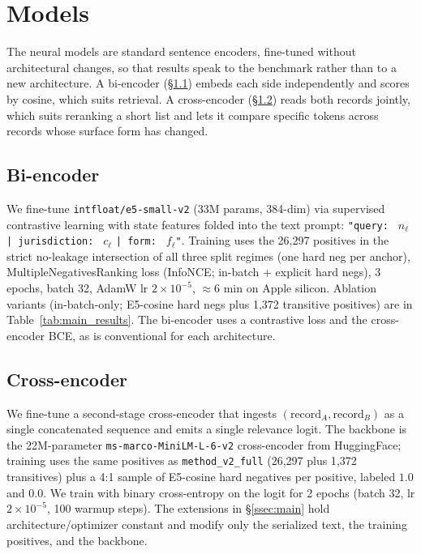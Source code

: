 \documentclass[sigconf]{acmart}
\begin{document}
\section{Models}
\label{sec:method}

The neural models are standard sentence encoders, fine-tuned
without architectural changes, so that results speak to the
benchmark rather than to a new architecture. A bi-encoder (\S\ref{ssec:bi}) embeds each side
independently and scores by cosine, which suits retrieval. A
cross-encoder (\S\ref{ssec:ce}) reads both records jointly, which
suits reranking a short list and lets it compare specific tokens
across records whose surface form has changed.

\subsection{Bi-encoder}
\label{ssec:bi}

We fine-tune \texttt{intfloat/e5-small-v2} (33M params, 384-dim) via
supervised contrastive learning with state features folded into the
text prompt: \texttt{"query: } $n_\ell$ \texttt{| jurisdiction: }
$c_\ell$ \texttt{| form: } $f_\ell$\texttt{"}. Training uses the
26{,}297 positives in the strict no-leakage intersection of all
three split regimes (one hard neg per anchor), MultipleNegativesRanking
loss (InfoNCE; in-batch + explicit hard negs), 3 epochs, batch 32,
AdamW lr $2\times10^{-5}$, $\approx$6 min on Apple silicon.
Ablation variants (in-batch-only; E5-cosine hard negs plus 1{,}372
transitive positives) are in Table~\ref{tab:main_results}. The
bi-encoder uses a contrastive loss and the cross-encoder BCE, as is
conventional for each architecture.

\subsection{Cross-encoder}
\label{ssec:ce}

We fine-tune a second-stage cross-encoder that ingests
$(\text{record}_A, \text{record}_B)$ as a single concatenated sequence
and emits a single relevance logit. The backbone is the
22M-parameter \texttt{ms-marco-\allowbreak MiniLM-L-6-v2} cross-encoder
from HuggingFace; training uses the same positives as
\texttt{method\_v2\_full} (26{,}297 plus 1{,}372 transitives)
plus a 4:1 sample of E5-cosine hard negatives per positive,
labeled $1.0$ and $0.0$. We train with binary cross-entropy on the
logit for 2 epochs (batch 32, lr $2\times 10^{-5}$, 100 warmup
steps). The extensions in
\S\ref{ssec:main} hold architecture/optimizer constant and modify only
the serialized text, the training positives, and the backbone.
\end{document}
